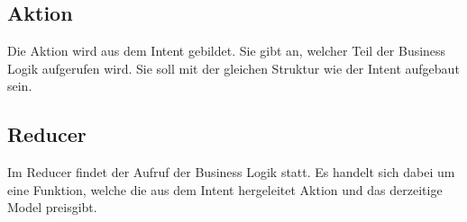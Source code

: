 \subsection{Aktion}
Die Aktion wird aus dem Intent gebildet. Sie gibt an, welcher Teil der Business Logik aufgerufen wird. Sie soll mit der gleichen Struktur wie der Intent aufgebaut sein.

\subsection{Reducer}
Im Reducer findet der Aufruf der Business Logik statt. Es handelt sich dabei um eine Funktion, welche die aus dem Intent hergeleitet Aktion und das derzeitige Model preisgibt.   
